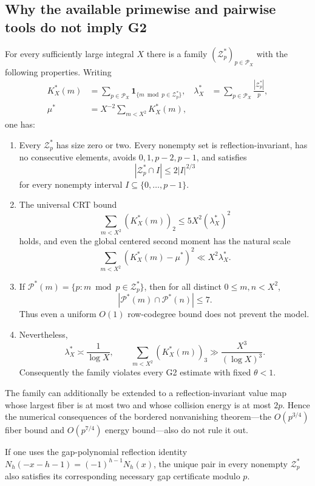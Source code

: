 \subsection*{Why the available primewise and pairwise tools do not imply G2}

\begin{proposition}
\label{prop:hm3-anchored-star}
For every sufficiently large integral $X$ there is a family
$(\mathcal Z_p^*)_{p\in\mathcal P_X}$ with the following properties.
Writing
\begin{align*}
 K_X^*(m)&=\sum_{p\in\mathcal P_X}
       \mathbf 1_{\{m\bmod p\in\mathcal Z_p^*\}},
 &\lambda_X^*&=\sum_{p\in\mathcal P_X}\frac{|\mathcal Z_p^*|}{p},\\
 \mu^*&=X^{-2}\sum_{m<X^2}K_X^*(m),
\end{align*}
one has:
\begin{enumerate}
\item Every $\mathcal Z_p^*$ has size zero or two.  Every nonempty set is
reflection-invariant, has no consecutive elements, avoids
$0,1,p-2,p-1$, and satisfies
\[
  |\mathcal Z_p^*\cap I|\le2|I|^{2/3}
\]
for every nonempty interval $I\subseteq\{0,\ldots,p-1\}$.
\item The universal CRT bound
\[
  \sum_{m<X^2}(K_X^*(m))_2\le5X^2(\lambda_X^*)^2
\]
holds, and even the global centered second moment has the natural scale
\[
  \sum_{m<X^2}(K_X^*(m)-\mu^*)^2\ll X^2\lambda_X^*.
\]
\item If $\mathcal P^*(m)=\{p:m\bmod p\in\mathcal Z_p^*\}$, then for all
distinct $0\le m,n<X^2$,
\[
  |\mathcal P^*(m)\cap\mathcal P^*(n)|\le7.
\]
Thus even a uniform $O(1)$ row-codegree bound does not prevent the model.
\item Nevertheless,
\[
  \lambda_X^*\asymp\frac1{\log X},
  \qquad
  \sum_{m<X^2}(K_X^*(m))_3
     \gg\frac{X^3}{(\log X)^3}.
\]
Consequently the family violates every G2 estimate with fixed
$\theta<1$.
\end{enumerate}
The family can additionally be extended to a reflection-invariant value
map whose largest fiber is at most two and whose collision energy is at
most $2p$.  Hence the numerical consequences of the bordered
nonvanishing theorem---the $O(p^{3/4})$ fiber bound and $O(p^{7/4})$
energy bound---also do not rule it out.

If one uses the gap-polynomial reflection identity
$N_h(-x-h-1)=(-1)^{h-1}N_h(x)$, the unique pair in every nonempty
$\mathcal Z_p^*$ also satisfies its corresponding necessary gap
certificate modulo $p$.
\end{proposition}

